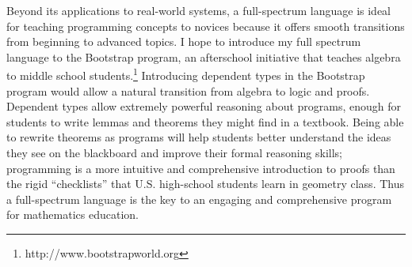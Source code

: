 \documentclass[12pt]{article}
\begin{document}
Beyond its applications to real-world systems, a full-spectrum language is ideal for teaching programming concepts to novices because it offers smooth transitions from beginning to advanced topics.
I hope to introduce my full spectrum language to the Bootstrap program, an afterschool initiative that teaches algebra to middle school students.\footnote{http://www.bootstrapworld.org}
Introducing dependent types in the Bootstrap program would allow a natural transition from algebra to logic and proofs.
Dependent types allow extremely powerful reasoning about programs, enough for students to write lemmas and theorems they might find in a textbook.
Being able to rewrite theorems as programs will help students better understand the ideas they see on the blackboard and improve their formal reasoning skills; programming is a more intuitive and comprehensive introduction to proofs than the rigid ``checklists'' that U.S. high-school students learn in geometry class.
Thus a full-spectrum language is the key to an engaging and comprehensive program for mathematics education.

\vfill{}
\renewcommand{\section}[2]{}
\begin{multicols}{2}
\footnotesize


\end{multicols}
\end{document}
